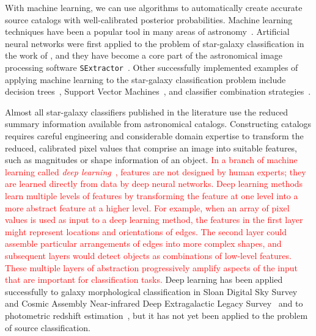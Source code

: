 \documentclass[fleqn,usenatbib]{mnras}
\newcommand{\changed}[1]{\textcolor{red}{#1}}
\begin{document}
With machine learning, we can use algorithms to automatically create
accurate source catalogs with well-calibrated posterior probabilities.
Machine learning techniques have been a popular tool
in many areas of astronomy~\citep{ball2007robust,ball2008robust,
banerji2010galaxy,
carrascokind2013tpz,carrascokind2014somz,carrascokind2014exhausting,
ivezic2014statistics,
kamdar2016machine1,kamdar2016machine2}. 
Artificial neural networks were first applied to the problem of star-galaxy
classification in the work of \citet{odewahn1992automated},
and they have become a core part of the astronomical image processing software
\texttt{SExtractor}~\citep{bertin1996sextractor}.
Other successfully implemented examples of applying machine learning to
the star-galaxy classification problem include decision 
trees~\citep{weir1995automated,suchkov2005census,ball2006robust,sevilla2015effect}, 
Support Vector Machines~\citep{Fadely2012}, and
classifier combination strategies~\citep{kim2015hybrid}.

Almost all star-galaxy classifiers published in the literature use
the reduced summary information available from astronomical catalogs.
Constructing catalogs requires careful engineering and considerable domain expertise
to transform the reduced, calibrated pixel values that comprise an image into suitable features,
such as magnitudes or shape information of an object.
\changed{
In a branch of machine learning called \textit{deep learning}~\citep{lecun2015deep},
features are not designed by human experts;
they are learned directly from data by deep neural networks.
Deep learning methods learn multiple levels of features by
transforming the feature at one level into a more abstract feature at a higher
level.
For example, when an array of pixel values is used as input to a deep learning
method, the features in the first layer might represent locations and orientations
of edges.
The second layer could assemble particular arrangements of edges into more
complex shapes, and subsequent layers would detect objects as
combinations of low-level features.
These multiple layers of abstraction progressively amplify aspects of the input
that are important for classification tasks.
}
Deep learning has been applied successfully to galaxy morphological
classification in Sloan Digital Sky Survey~\citep[SDSS;][]{dieleman2015rotation}
and Cosmic Assembly Near-infrared Deep Extragalactic Legacy
Survey~\citep[CANDELS;][]{huertas2015catalog} and to photometric redshift
estimation~\citep{hoyle2015measuring},
but it has not yet been applied to the problem of source classification.
\end{document}

